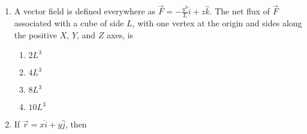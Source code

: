 \documentclass[journal]{IEEEtran}
\begin{document}
\begin{enumerate}
\begin{enumerate}
\item $6, 1$  
$\begin{bmatrix} $4$ \\ $1$ \end{bmatrix}$ 
$\begin{bmatrix} $1$ \\ $-1$ \end{bmatrix}$
\item $2, 5$  
$\begin{bmatrix} $4$ \\ $1$ \end{bmatrix}$ 
$\begin{bmatrix} $1$ \\ $-1$ \end{bmatrix}$
\item  $6, 1$  
$\begin{bmatrix} $1$ \\ $4$ \end{bmatrix}$ 
$\begin{bmatrix} $1$ \\ $-1$ \end{bmatrix}$
\item $2, 5$  
$\begin{bmatrix} $1$ \\ $4$ \end{bmatrix}$ 
$\begin{bmatrix} $1$ \\ $-1$ \end{bmatrix}$
\end{enumerate}
\newpage
\item A vector field is defined everywhere as $\vec{F} = -\frac{y^2}{L} \hat{i} + z \hat{k}$. The net flux of $\vec{F}$ associated with a cube of side $L$, with one vertex at the origin and sides along the positive $X$, $Y$, and $Z$ axes, is

\begin{enumerate}
\item $2L^3$ \quad
\item $4L^3$ \quad
\item $8L^3$ \quad
\item $10L^3$
\end{enumerate}


\item If $\vec{r} = x \hat{i} + y \hat{j}$, then


\begin{enumerate}


\end{enumerate}
\end{enumerate}
\end{document}
